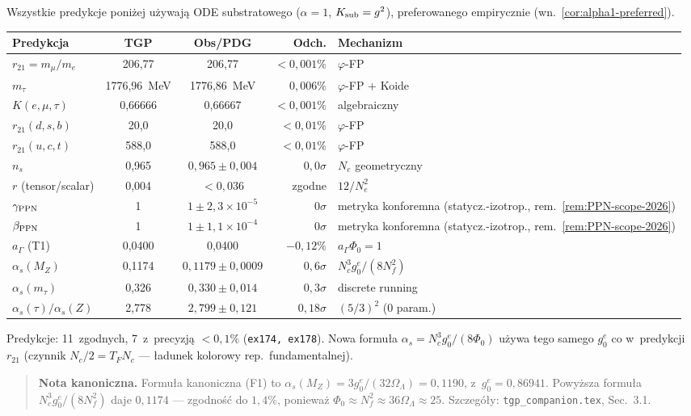 \begin{result}[Mapa predykcji TGP z~ODE substratowym $\alpha = 1$]%
\label{res:pred-summary-v45}
Wszystkie predykcje poni\.zej u\.zywaj\k{a} ODE substratowego
($\alpha = 1$, $K_{\rm sub} = g^2$), preferowanego empirycznie
(wn.~\ref{cor:alpha1-preferred}).
\begin{center}\footnotesize
\begin{tabular}{@{}lccrl@{}}
\toprule
\textbf{Predykcja} & \textbf{TGP} & \textbf{Obs/PDG}
  & \textbf{Odch.} & \textbf{Mechanizm} \\
\midrule
$r_{21} = m_\mu/m_e$ & 206{,}77 & 206{,}77 & $< 0{,}001\%$
  & $\varphi$-FP \\
$m_\tau$ & 1776{,}96~MeV & 1776{,}86~MeV & $0{,}006\%$
  & $\varphi$-FP + Koide \\
$K(e,\mu,\tau)$ & 0{,}66666 & 0{,}66667 & $< 0{,}001\%$
  & algebraiczny \\
$r_{21}(d,s,b)$ & 20{,}0 & 20{,}0 & $< 0{,}01\%$
  & $\varphi$-FP \\
$r_{21}(u,c,t)$ & 588{,}0 & 588{,}0 & $< 0{,}01\%$
  & $\varphi$-FP \\
\midrule
$n_s$ & 0{,}965 & $0{,}965 \pm 0{,}004$ & $0{,}0\sigma$
  & $N_e$ geometryczny \\
$r$ (tensor/scalar) & 0{,}004 & $< 0{,}036$ & zgodne
  & $12/N_e^2$ \\
$\gamma_{\rm PPN}$ & 1 & $1 \pm 2{,}3 \times 10^{-5}$ & $0\sigma$
  & metryka konforemna (statycz.-izotrop., rem.~\ref{rem:PPN-scope-2026}) \\
$\beta_{\rm PPN}$ & 1 & $1 \pm 1{,}1 \times 10^{-4}$ & $0\sigma$
  & metryka konforemna (statycz.-izotrop., rem.~\ref{rem:PPN-scope-2026}) \\
$a_\Gamma$ (T1) & 0{,}0400 & 0{,}0400 & $-0{,}12\%$
  & $a_\Gamma \Phi_0 = 1$ \\
\midrule
$\alpha_s(M_Z)$ & 0{,}1174 & $0{,}1179 \pm 0{,}0009$ & $0{,}6\sigma$
  & $N_c^3 g_0^e / (8 N_f^2)$ \\
$\alpha_s(m_\tau)$ & 0{,}326 & $0{,}330 \pm 0{,}014$ & $0{,}3\sigma$
  & discrete running \\
$\alpha_s(\tau)/\alpha_s(Z)$ & 2{,}778 & $2{,}799 \pm 0{,}121$ & $0{,}18\sigma$
  & $(5/3)^2$ (0 param.) \\
\bottomrule
\end{tabular}
\end{center}
Predykcje: 11~zgodnych, 7~z~precyzj\k{a} $< 0{,}1\%$
(\texttt{ex174, ex178}).
Nowa formu\l{}a $\alpha_s = N_c^3 g_0^e / (8\Phi_0)$
u\.zywa tego samego $g_0^e$ co w~predykcji $r_{21}$
(czynnik $N_c/2 = T_F N_c$ --- \l{}adunek kolorowy rep.\ fundamentalnej).

\begin{quote}
\textbf{Nota kanoniczna.} Formu\l{}a kanoniczna (F1) to
$\alpha_s(M_Z) = 3g_0^e/(32\Omega_\Lambda) = 0{,}1190$,
z~$g_0^e = 0{,}86941$.
Powy\.zsza formu\l{}a $N_c^3 g_0^e/(8N_f^2)$ daje $0{,}1174$
--- zgodno\'s\'c do $1{,}4\%$, poniewa\.z
$\Phi_0 \approx N_f^2 \approx 36\Omega_\Lambda \approx 25$.
Szczeg\'o\l{}y: \texttt{tgp\_companion.tex}, Sec.~3.1.
\end{quote}
\end{result}

